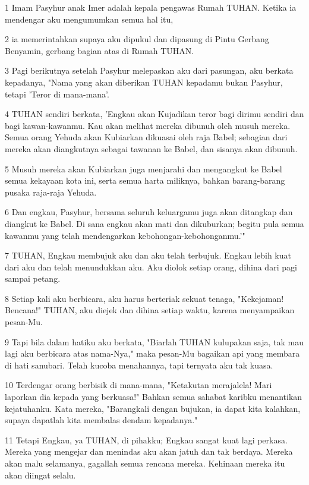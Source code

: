 \par 1 Imam Pasyhur anak Imer adalah kepala pengawas Rumah TUHAN. Ketika ia mendengar aku mengumumkan semua hal itu,
\par 2 ia memerintahkan supaya aku dipukul dan dipasung di Pintu Gerbang Benyamin, gerbang bagian atas di Rumah TUHAN.
\par 3 Pagi berikutnya setelah Pasyhur melepaskan aku dari pasungan, aku berkata kepadanya, "Nama yang akan diberikan TUHAN kepadamu bukan Pasyhur, tetapi 'Teror di mana-mana'.
\par 4 TUHAN sendiri berkata, 'Engkau akan Kujadikan teror bagi dirimu sendiri dan bagi kawan-kawanmu. Kau akan melihat mereka dibunuh oleh musuh mereka. Semua orang Yehuda akan Kubiarkan dikuasai oleh raja Babel; sebagian dari mereka akan diangkutnya sebagai tawanan ke Babel, dan sisanya akan dibunuh.
\par 5 Musuh mereka akan Kubiarkan juga menjarahi dan mengangkut ke Babel semua kekayaan kota ini, serta semua harta miliknya, bahkan barang-barang pusaka raja-raja Yehuda.
\par 6 Dan engkau, Pasyhur, bersama seluruh keluargamu juga akan ditangkap dan diangkut ke Babel. Di sana engkau akan mati dan dikuburkan; begitu pula semua kawanmu yang telah mendengarkan kebohongan-kebohonganmu.'"
\par 7 TUHAN, Engkau membujuk aku dan aku telah terbujuk. Engkau lebih kuat dari aku dan telah menundukkan aku. Aku diolok setiap orang, dihina dari pagi sampai petang.
\par 8 Setiap kali aku berbicara, aku harus berteriak sekuat tenaga, "Kekejaman! Bencana!" TUHAN, aku diejek dan dihina setiap waktu, karena menyampaikan pesan-Mu.
\par 9 Tapi bila dalam hatiku aku berkata, "Biarlah TUHAN kulupakan saja, tak mau lagi aku berbicara atas nama-Nya," maka pesan-Mu bagaikan api yang membara di hati sanubari. Telah kucoba menahannya, tapi ternyata aku tak kuasa.
\par 10 Terdengar orang berbisik di mana-mana, "Ketakutan merajalela! Mari laporkan dia kepada yang berkuasa!" Bahkan semua sahabat karibku menantikan kejatuhanku. Kata mereka, "Barangkali dengan bujukan, ia dapat kita kalahkan, supaya dapatlah kita membalas dendam kepadanya."
\par 11 Tetapi Engkau, ya TUHAN, di pihakku; Engkau sangat kuat lagi perkasa. Mereka yang mengejar dan menindas aku akan jatuh dan tak berdaya. Mereka akan malu selamanya, gagallah semua rencana mereka. Kehinaan mereka itu akan diingat selalu.

